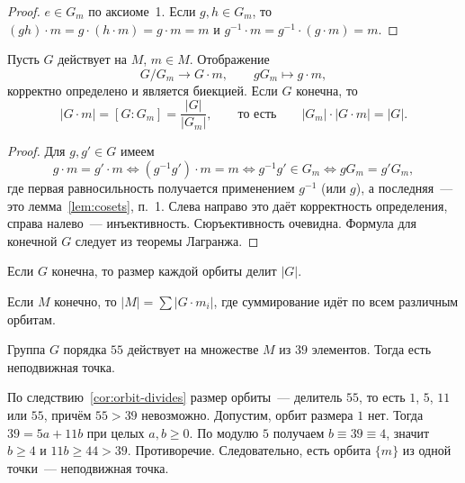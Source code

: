 \documentclass[12pt]{article}
\begin{document}
	\begin{proof}
		$e \in G_m$ по аксиоме~1. Если $g, h \in G_m$, то $(gh) \cdot m = g \cdot (h \cdot m) = g \cdot m = m$ и $g^{-1} \cdot m = g^{-1} \cdot (g \cdot m) = m$.
	\end{proof}

	\begin{theorem}\label{thm:orbit-stabilizer}
		Пусть $G$ действует на $M$, $m \in M$. Отображение
		\[
			G/G_m \to G \cdot m, \qquad gG_m \mapsto g \cdot m,
		\]
		корректно определено и является биекцией. Если $G$ конечна, то
		\[
			|G \cdot m| = [G : G_m] = \frac{|G|}{|G_m|}, \qquad\text{то есть}\qquad |G_m| \cdot |G \cdot m| = |G|.
		\]
	\end{theorem}

	\begin{proof}
		Для $g, g' \in G$ имеем
		\[
			g \cdot m = g' \cdot m \iff (g^{-1}g') \cdot m = m \iff g^{-1}g' \in G_m \iff gG_m = g'G_m,
		\]
		где первая равносильность получается применением $g^{-1}$ (или $g$), а последняя~--- это лемма~\ref{lem:cosets}, п.~1. Слева направо это даёт корректность определения, справа налево~--- инъективность. Сюръективность очевидна. Формула для конечной $G$ следует из теоремы Лагранжа.
	\end{proof}

	\begin{corollary}\label{cor:orbit-divides}
		Если $G$ конечна, то размер каждой орбиты делит $|G|$.
	\end{corollary}

	\begin{corollary}\label{cor:orbit-sum}
		Если $M$ конечно, то $|M| = \sum |G \cdot m_i|$, где суммирование идёт по всем различным орбитам.
	\end{corollary}

	\begin{example}
		Группа $G$ порядка $55$ действует на множестве $M$ из $39$ элементов. Тогда есть неподвижная точка.

		По следствию~\ref{cor:orbit-divides} размер орбиты~--- делитель $55$, то есть $1$, $5$, $11$ или $55$, причём $55 > 39$ невозможно. Допустим, орбит размера $1$ нет. Тогда $39 = 5a + 11b$ при целых $a, b \geqslant 0$. По модулю $5$ получаем $b \equiv 39 \equiv 4$, значит $b \geqslant 4$ и $11b \geqslant 44 > 39$. Противоречие. Следовательно, есть орбита $\{m\}$ из одной точки~--- неподвижная точка.
	\end{example}
\end{document}
